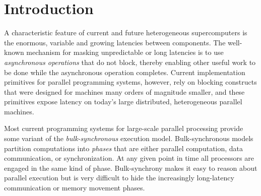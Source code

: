 
\section{Introduction}
\label{sec:intro}





A characteristic feature of current and future heterogeneous
supercomputers is the enormous, variable and growing latencies between
components.  The well-known mechanism for masking unpredictable or
long latencies is to use {\em asynchronous operations} that do not block,
thereby enabling other useful work to be done while the asynchronous
operation completes. Current implementation primitives for parallel
programming systems, however, rely on blocking constructs that were
designed for machines many orders of magnitude
smaller\cite{MPI,COARRAY_FORTRAN,UPC99}, and these primitives expose
latency on today's large distributed, heterogeneous parallel machines.


Most current programming systems for large-scale parallel processing provide some variant
of the {\em bulk-synchronous} execution model\cite{Valiant90}.  Bulk-synchronous models
partition computations into {\em phases} that are either parallel computation, data
communication, or synchronization.  At any given point in time all processors
are engaged in the same kind of phase.  Bulk-synchrony
makes it easy to reason about parallel execution but
is very difficult to hide the increasingly long-latency communication
or memory movement phases.  


